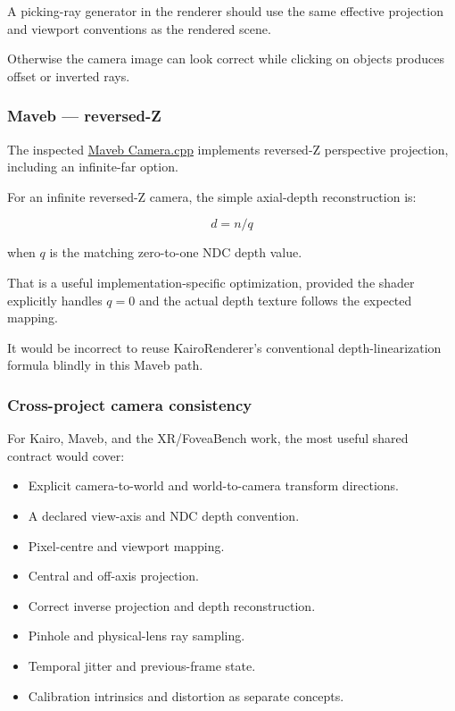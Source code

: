A picking-ray generator in the renderer should use the same effective projection and viewport conventions as the rendered scene.

Otherwise the camera image can look correct while clicking on objects produces offset or inverted rays.

\subsubsection{Maveb --- reversed-Z}\label{maveb-reversed-z}

The inspected \href{https://github.com/swayam8624/Maveb/blob/main/engine/scene/src/Camera.cpp?utm_source=chatgpt.com}{Maveb Camera.cpp} implements reversed-Z perspective projection, including an infinite-far option.

For an infinite reversed-Z camera, the simple axial-depth reconstruction is:

\[ \boxed{d=n/q} \]

when \(q\) is the matching zero-to-one NDC depth value.

That is a useful implementation-specific optimization, provided the shader explicitly handles \(q=0\) and the actual depth texture follows the expected mapping.

It would be incorrect to reuse KairoRenderer's conventional depth-linearization formula blindly in this Maveb path.

\subsubsection{Cross-project camera consistency}\label{cross-project-camera-consistency}

For Kairo, Maveb, and the XR/FoveaBench work, the most useful shared contract would cover:

\begin{itemize}
\tightlist
\item
  Explicit camera-to-world and world-to-camera transform directions.
\item
  A declared view-axis and NDC depth convention.
\item
  Pixel-centre and viewport mapping.
\item
  Central and off-axis projection.
\item
  Correct inverse projection and depth reconstruction.
\item
  Pinhole and physical-lens ray sampling.
\item
  Temporal jitter and previous-frame state.
\item
  Calibration intrinsics and distortion as separate concepts.
\end{itemize}

